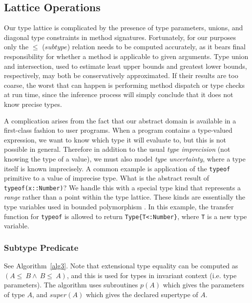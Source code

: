 \documentclass[9pt]{sigplanconf}
\begin{document}


\subsection{Lattice Operations}

Our type lattice is complicated by the presence of type parameters, unions,
and diagonal type constraints in method signatures. Fortunately, for our
purposes only the $\leq$ ($subtype$) relation needs to be computed accurately,
as it bears final responsibility for whether a method is applicable to
given arguments. Type union and intersection, used to estimate
least upper bounds and greatest lower bounds, respectively, may both be
conservatively approximated. If their results are too coarse, the
worst that can happen is performing method dispatch or type checks
at run time, since the inference process will simply conclude that it does
not know precise types.

A complication arises from the fact that our abstract domain is
available in a first-class fashion to user programs. When a program
contains a type-valued expression, we want to know which type it will
evaluate to, but this is not possible in general. Therefore in addition
to the usual \emph{type imprecision} (not knowing the type of a value),
we must also model \emph{type uncertainty}, where a type itself is
known imprecisely. A common example is application of the {\tt typeof}
primitive to a value of imprecise type. What is the abstract result of
{\tt typeof(x::Number)}? We handle this with a special type kind that
represents a \emph{range} rather than a point within the type lattice.
These kinds are essentially the type variables used in bounded
polymorphism \cite{boundedquant}. In this example, the
transfer function for {\tt typeof} is allowed to return
{\tt Type\{T<:Number\}}, where {\tt T} is a new type variable.


\subsubsection{Subtype Predicate}

See Algorithm~\ref{alg3}. Note that extensional type equality can be
computed as $(A\leq~B\land~B\leq~A)$, and this is used for types in
invariant context (i.e. type parameters). The algorithm uses subroutines
$p(A)$ which gives the parameters of type $A$, and $super(A)$ which gives
the declared supertype of $A$.
\end{document}
